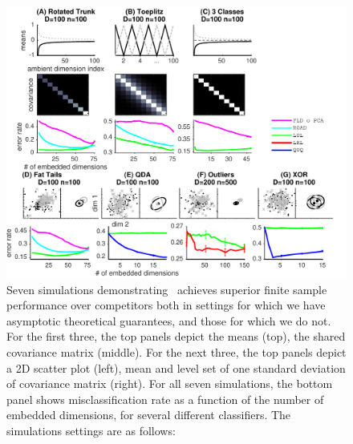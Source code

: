 \documentclass[10pt]{article}
\begin{document}
%





\begin{figure}[h!]
\centering
\includegraphics[width=1\linewidth]{../Figs/properties}
\caption{
Seven simulations demonstrating \Lol~achieves superior finite sample performance over competitors both in settings for which we have asymptotic theoretical guarantees, and those for which we do not. 
For the first three, the top panels depict the means (top), the shared covariance matrix (middle).  For the next three, the top panels depict a 2D scatter plot (left), mean and level set of one standard deviation of covariance matrix (right).  For all seven simulations, the bottom panel shows misclassification rate as a function of the number of embedded dimensions, for several different classifiers.  The simulations settings are as follows:
}
\end{figure}
\end{document}
